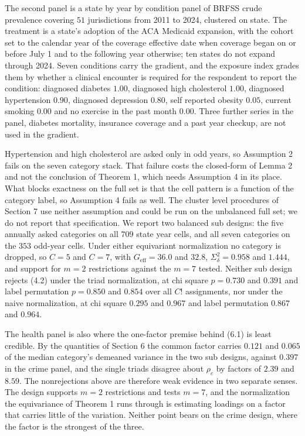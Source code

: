 \documentclass[12pt]{article}
\theoremstyle{definition}
\numberwithin{equation}{section}
\begin{document}
The second panel is a state by year by condition panel of BRFSS crude
prevalence covering $51$ jurisdictions from 2011 to 2024, clustered on state.
The treatment is a state's adoption of the ACA Medicaid expansion, with the
cohort set to the calendar year of the coverage effective date when coverage
began on or before July 1 and to the following year otherwise; ten states do
not expand through 2024. Seven conditions carry the gradient, and the exposure
index grades them by whether a clinical encounter is required for the
respondent to report the condition: diagnosed diabetes $1.00$, diagnosed high
cholesterol $1.00$, diagnosed hypertension $0.90$, diagnosed depression $0.80$,
self reported obesity $0.05$, current smoking $0.00$ and no exercise in the past
month $0.00$. Three further series in the panel, diabetes mortality, insurance
coverage and a past year checkup, are not used in the gradient.

Hypertension and high cholesterol are asked only in odd years, so Assumption
2 fails on the seven category stack. That failure costs the closed-form of Lemma 2 and not the conclusion of Theorem 1, which
needs Assumption 4 in its place. What blocks exactness on the full set
is that the cell pattern is a function of the category label, so Assumption
4 fails as well. The cluster level procedures of Section
7 use neither assumption and could be run on the unbalanced full
set; we do not report that specification. We report two balanced sub designs:
the five annually asked categories on all $709$ state year cells, and all seven
categories on the $353$ odd-year cells. Under either equivariant normalization
no category is dropped, so $C = 5$ and $C = 7$, with $G_{\mathrm{eff}} = 36.0$
and $32.8$, $\Sigma_\delta^2 = 0.958$ and $1.444$, and support for $m = 2$
restrictions against the $m = 7$ tested. Neither sub design rejects
(4.2) under the triad normalization, at chi square $p = 0.730$ and
$0.391$ and label permutation $p = 0.850$ and $0.854$ over all $C!$ assignments,
nor under the naive normalization, at chi square $0.295$ and $0.967$ and label
permutation $0.867$ and $0.964$.

The health panel is also where the one-factor premise behind (6.1) is
least credible. By the quantities of Section 6 the common factor
carries $0.121$ and $0.065$ of the median category's demeaned variance in the
two sub designs, against $0.397$ in the crime panel, and the single triads
disagree about $\rho_c$ by factors of $2.39$ and $8.59$. The nonrejections above
are therefore weak evidence in two separate senses. The design supports $m = 2$
restrictions and tests $m = 7$, and the normalization the equivariance of
Theorem 1 runs through is estimating loadings on a factor that
carries little of the variation. Neither point bears on the crime design, where
the factor is the strongest of the three.
\end{document}
